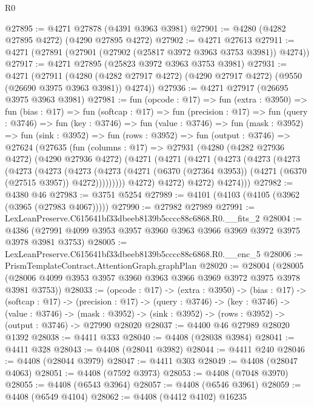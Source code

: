 \begin{lexlean}{R0}
\begin{coremodule}
@27895 := @4271 @27878 (@4391 @3963 @3981)
@27901 := @4280 (@4282 @27895 @4272) (@4290 @27895 @4272)
@27902 := @4271 @27613
@27911 := @4271 (@27891 (@27901 (@27902 (@25817 @3972 @3963 @3753 @3981)) @4274))
@27917 := @4271 @27895 (@25823 @3972 @3963 @3753 @3981)
@27931 := @4271
    (@27911
      (@4280 (@4282 @27917 @4272) (@4290 @27917 @4272) (@9550 (@26690 @3975 @3963 @3981)) @4274))
@27936 := @4271 @27917 (@26695 @3975 @3963 @3981)
@27981 := fun (opcode : @17) =>
  fun (extra : @3950) =>
  fun (bias : @17) =>
  fun (softcap : @17) =>
  fun (precision : @17) =>
  fun (query : @3746) =>
  fun (key : @3746) =>
  fun (value : @3746) =>
  fun (mask : @3952) =>
  fun (sink : @3952) =>
  fun (rows : @3952) =>
  fun (output : @3746) =>
  @27624
    (@27635
      (fun (columns : @17) =>
      @27931
        (@4280
          (@4282 @27936 @4272)
          (@4290 @27936 @4272)
          (@4271
            (@4271
              (@4271
                (@4273
                  (@4273
                    (@4273
                      (@4273
                        (@4273
                          (@4273
                            (@4273
                              (@4271
                                (@6370 (@27364 @3953))
                                (@4271 (@6370 (@27515 @3957)) @4272)))))))))
                @4272)
              @4272)
            @4272)
          @4274)))
@27982 := @4380 @46
@27983 := @3751 @5254
@27989 := @4101 (@4103 (@4105 (@3962 (@3965 (@27983 @4067)))))
@27990 := @27982 @27989
@27991 := LexLeanPreserve.C615641bf33dbeeb8139b5cccc88c6868.R0.__fits_2
@28004 := @4386 (@27991 @4099 @3953 @3957 @3960 @3963 @3966 @3969 @3972 @3975 @3978 @3981 @3753)
@28005 := LexLeanPreserve.C615641bf33dbeeb8139b5cccc88c6868.R0.__enc_5
@28006 := PrismTemplateContract.AttentionGraph.graphPlan
@28020 := @28004
    (@28005 (@28006 @4099 @3953 @3957 @3960 @3963 @3966 @3969 @3972 @3975 @3978 @3981 @3753))
@28033 := (opcode : @17) ->
  (extra : @3950) ->
  (bias : @17) ->
  (softcap : @17) ->
  (precision : @17) ->
  (query : @3746) ->
  (key : @3746) ->
  (value : @3746) ->
  (mask : @3952) -> (sink : @3952) -> (rows : @3952) -> (output : @3746) -> @27990 @28020
@28037 := @4400 @46 @27989 @28020 @1392
@28038 := @4411 @333
@28040 := @4408 (@28038 @3984)
@28041 := @4411 @328
@28043 := @4408 (@28041 @3982)
@28044 := @4411 @240
@28046 := @4408 (@28044 @3979)
@28047 := @4411 @303
@28049 := @4408 (@28047 @4063)
@28051 := @4408 (@7592 @3973)
@28053 := @4408 (@7048 @3970)
@28055 := @4408 (@6543 @3964)
@28057 := @4408 (@6546 @3961)
@28059 := @4408 (@6549 @4104)
@28062 := @4408 (@4412 @4102) @16235

\end{coremodule}
\end{lexlean}
